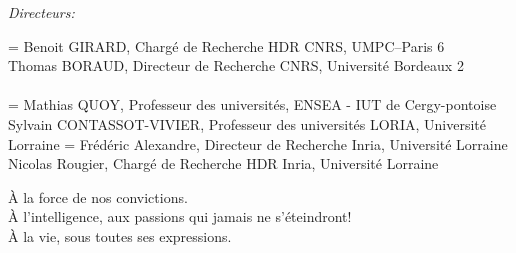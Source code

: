 \documentclass[11pt,utf8x]{thloria}
\begin{document}
{\it Directeurs:}


\def\blanc{\hspace*{1cm}}

\Rapporteurs  = {Benoit GIRARD, Charg\'e de Recherche HDR CNRS, UMPC–Paris 6\\
                 Thomas BORAUD, Directeur de Recherche CNRS, Université Bordeaux 2\\
                 \blanc \\
                }
\Examinateurs = {Mathias QUOY, Professeur des universités, ENSEA - IUT de Cergy-pontoise \\
                Sylvain CONTASSOT-VIVIER, Professeur des universités LORIA, Universit\'e Lorraine }
\Directeur = {Fr{\'e}d{\'e}ric Alexandre, Directeur de Recherche Inria, Universit\'e Lorraine
     \\ Nicolas Rougier, Charg\'e de Recherche HDR Inria, Universit\'e Lorraine}
\MakeThesisTitlePage








\begin{ThesisDedication}
\`A la force de nos convictions.\\
\`A l'intelligence, aux passions qui jamais ne s'éteindront!\\
\`A la vie, sous toutes ses expressions.
\end{ThesisDedication}

\end{document}

